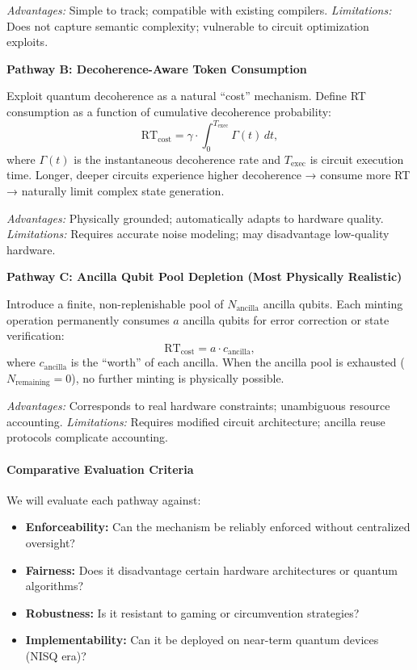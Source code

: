 \documentclass[a4paper,10.5pt,twoside]{article}
\begin{document}
\textit{Advantages:} Simple to track; compatible with existing compilers.  
\textit{Limitations:} Does not capture semantic complexity; vulnerable to circuit optimization exploits.

\textbf{Pathway B: Decoherence-Aware Token Consumption}

Exploit quantum decoherence as a natural ``cost'' mechanism.  
Define RT consumption as a function of cumulative decoherence probability:
\[
\text{RT}_{\text{cost}} = \gamma \cdot \int_0^{T_{\text{exec}}} \Gamma(t) \, dt,
\]
where $\Gamma(t)$ is the instantaneous decoherence rate and $T_{\text{exec}}$ is circuit execution time.  
Longer, deeper circuits experience higher decoherence → consume more RT → naturally limit complex state generation.

\textit{Advantages:} Physically grounded; automatically adapts to hardware quality.  
\textit{Limitations:} Requires accurate noise modeling; may disadvantage low-quality hardware.

\textbf{Pathway C: Ancilla Qubit Pool Depletion (Most Physically Realistic)}

Introduce a finite, non-replenishable pool of $N_{\text{ancilla}}$ ancilla qubits.  
Each minting operation permanently consumes $a$ ancilla qubits for error correction or state verification:
\[
\text{RT}_{\text{cost}} = a \cdot c_{\text{ancilla}},
\]
where $c_{\text{ancilla}}$ is the ``worth'' of each ancilla.  
When the ancilla pool is exhausted ($N_{\text{remaining}} = 0$), no further minting is physically possible.

\textit{Advantages:} Corresponds to real hardware constraints; unambiguous resource accounting.  
\textit{Limitations:} Requires modified circuit architecture; ancilla reuse protocols complicate accounting.

\paragraph{Comparative Evaluation Criteria}

We will evaluate each pathway against:
\begin{itemize}
    \item \textbf{Enforceability:} Can the mechanism be reliably enforced without centralized oversight?
    \item \textbf{Fairness:} Does it disadvantage certain hardware architectures or quantum algorithms?
    \item \textbf{Robustness:} Is it resistant to gaming or circumvention strategies?
    \item \textbf{Implementability:} Can it be deployed on near-term quantum devices (NISQ era)?
\end{itemize}
\end{document}
